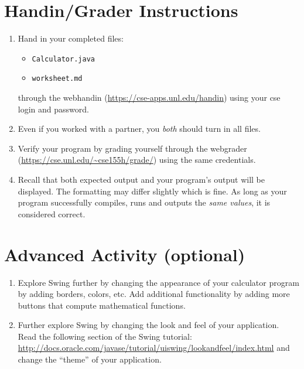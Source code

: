 \documentclass[12pt]{scrartcl}
\begin{document}
\section{Handin/Grader Instructions}

\begin{enumerate}
  \item Hand in your completed files:
    \begin{itemize}
    \item \texttt{Calculator.java}
    \item \texttt{worksheet.md}
  \end{itemize}
  through the webhandin (\url{https://cse-apps.unl.edu/handin}) 
  using your cse login and password.  
  \item Even if you worked with a partner, you \emph{both} should
  turn in all files.
  \item Verify your program by grading yourself through the
  webgrader (\url{https://cse.unl.edu/~cse155h/grade/}) using the
  same credentials.
  \item Recall that both expected output and your program's output
  will be displayed.  The formatting may differ slightly which is fine.
  As long as your program successfully compiles, runs and outputs 
  the \emph{same values}, it is considered correct.
\end{enumerate}


\section{Advanced Activity (optional)}

\begin{enumerate}
  \item Explore Swing further by changing the appearance of your calculator 
	program by adding borders, colors, etc.  Add additional functionality by adding 
	more buttons that compute mathematical functions.
  \item Further explore Swing by changing the look and feel of your application.  
	Read the following section of the Swing tutorial: \url{http://docs.oracle.com/javase/tutorial/uiswing/lookandfeel/index.html} 		and change the ``theme'' of your application.
\end{enumerate}

	
\end{document}

